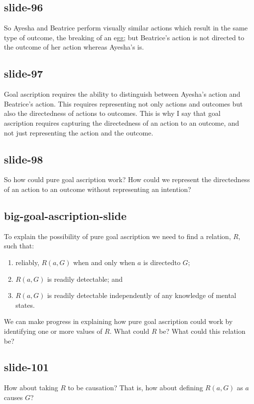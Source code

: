\documentclass[12pt,\papersize]{extarticle}
\begin{document}
 
\subsection{slide-96}
So Ayesha and Beatrice perform visually similar actions which result in the same type of outcome, the breaking of an egg; but Beatrice's action is not directed to the outcome of her action whereas Ayesha's is.
 
 
\subsection{slide-97}
Goal ascription requires the ability to distinguish between Ayesha's action and Beatrice's action. This requires representing not only actions and outcomes but also the directedness of actions to outcomes.
This is why I say that goal ascription requires capturing the directedness of an action to an outcome, and not just representing the action and the outcome.
 
 
\subsection{slide-98}
So how could pure goal ascription work? How could we represent the directedness of an action to an outcome without representing an intention?
 
 
\subsection{big-goal-ascription-slide}
To explain the possibility of pure goal ascription we need to find a relation, $R$, such that: \begin{enumerate} \item reliably, $R(a,G)$ when and only when $a$ is directed\footnotemark to $G$; \item $R(a,G)$ is readily detectable; and \item $R(a,G)$ is readily detectable independently of any knowledge of mental states. \end{enumerate}
We can make progress in explaining how pure goal ascription could work by identifying one or more values of $R$. What could $R$ be?
What could this relation be?
 
 
\subsection{slide-101}
How about taking $R$ to be causation? That is, how about defining $R(a,G)$ as $a$ causes $G$?
 
\end{document}

